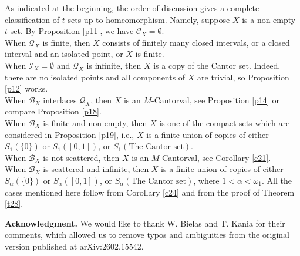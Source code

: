 \documentclass[12pt,a4paper,leqno]{amsart}
\theoremstyle{definition}
\begin{document}
As indicated at the beginning, the order of discussion gives a complete classification of $t$-sets up to homeomorphism. Namely, suppose $X$ is a non-empty $t$-set. By Proposition \ref{p11}, we have $\mathcal C_X = \emptyset$. 
\vspace{2mm}\\ \indent 
	 When $\mathcal Q_X$ is finite, then  $X$ consists of finitely many closed intervals, or a closed interval and an isolated point, or $X$ is finite.
	\vspace{1mm}\\  \indent When $\mathcal I_X = \emptyset$ and $\mathcal Q_X$ is infinite, then $X$ is a copy of the Cantor set. Indeed,  there are no isolated points and all components of $X$ are trivial, so  Proposition \ref{p12} works. 
\vspace{1mm} \\ \indent When $\mathcal B_X $ interlaces  $\mathcal Q_X$, then $X$ is an $M$-Cantorval, see Proposition \ref{p14} or compare Proposition \ref{p18}.
\vspace{1mm} \\ \indent When $\mathcal B_X$ is finite and non-empty, then $X$ is one of  the compact sets which are considered in Proposition \ref{p19}, i.e., $X$ is a finite union of copies  of either $S_1(\{0\})$ or $S_1([0,1])$, or $S_1(\mbox{The Cantor set})$. 
\vspace{1mm} \\ \indent When $\mathcal B_X$ is not scattered, then $X$ is an $M$-Cantorval, see Corollary \ref{c21}.
\vspace{1mm} \\ \indent
 When $\mathcal B_X$ is scattered and infinite, then   $X$ is a finite union of copies  of either $S_\alpha(\{0\})$ or $S_\alpha([0,1])$, or $S_\alpha(\mbox{The Cantor set})$, where $1<\alpha <\omega_1$. All the cases mentioned here follow from Corollary \ref{c24} and from the proof of Theorem \ref{t28}.

\textbf{Acknowledgment. } We would like to thank W. Bielas and T. Kania for their comments, which allowed us to remove typos and ambiguities from the original version published at arXiv:2602.15542. 
\end{document}
